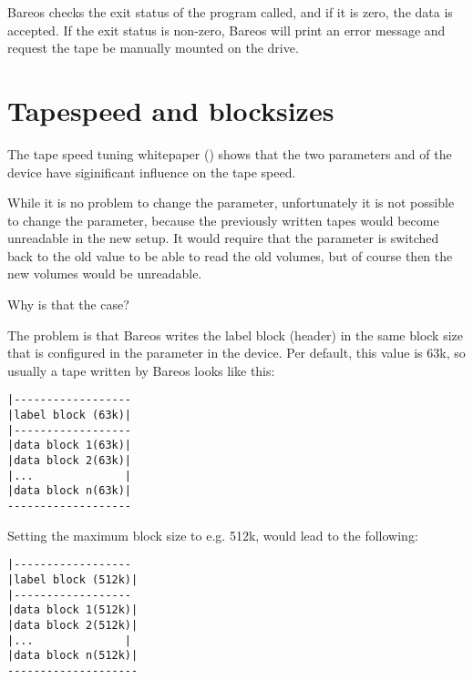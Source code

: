 Bareos checks the exit status of the program called, and if it is zero, the
data is accepted. If the exit status is non-zero, Bareos will print an
error message and request the tape be manually mounted on the drive.


\section{Tapespeed and blocksizes}
\label{Tapespeed and blocksizes}
\label{setblocksizes}

The tape speed tuning whitepaper ()
shows that the two parameters
 and  of the device
have siginificant influence on the tape speed.

While it is no problem to change the  parameter,
unfortunately it is not possible to change the 
parameter, because the previously written tapes would become unreadable
in the new setup. It would require that the  parameter
is switched back to the old value to be able to read the old volumes, but
of course then the new volumes would be unreadable.

Why is that the case?

The problem is that Bareos writes the label block (header) in the same block
size that is configured in the  parameter in the device.
Per default, this value is 63k, so usually a tape written by Bareos looks like this:

\begin{verbatim}
|------------------
|label block (63k)|
|------------------
|data block 1(63k)|
|data block 2(63k)|
|...              |
|data block n(63k)|
-------------------
\end{verbatim}
Setting the maximum block size to e.g. 512k, would lead to the following:
\begin{verbatim}
|------------------
|label block (512k)|
|------------------
|data block 1(512k)|
|data block 2(512k)|
|...              |
|data block n(512k)|
--------------------
\end{verbatim}

